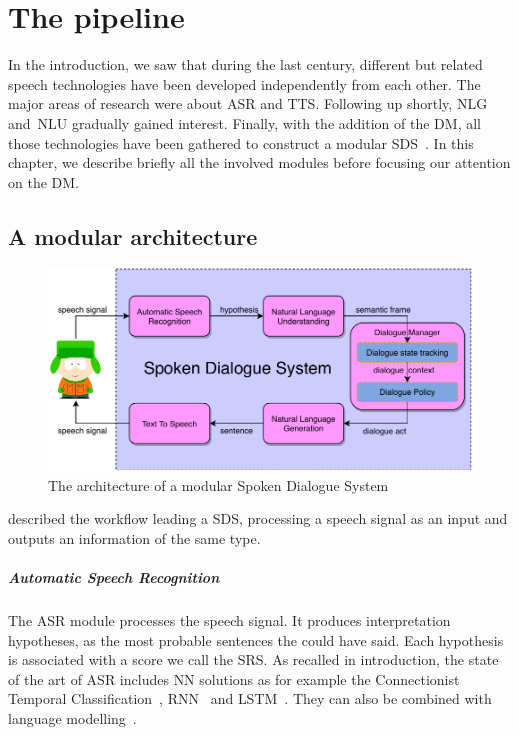 \chapter{The pipeline}
\label{chapter:the-pipeline}

In the introduction, we saw that during the last century, different but related speech technologies have been developed independently from each other. The major areas of research were about \acrfull{ASR} and \acrfull{TTS}. Following up shortly, \acrfull{NLG} and \acrfull{NLU} gradually gained interest. Finally, with the addition of the \acrfull{DM}, all those technologies have been gathered to construct a modular \acrfull{SDS}~\parencite{Jurafsky2000-intro-sds}. In this chapter, we describe briefly all the involved modules before focusing our attention on the \gls{DM}.

\section{A modular architecture}

\begin{figure}

    \includegraphics[width=\textwidth]{sources/pipeline/pipeline}
    \caption{\label{fig:pipeline} The architecture of a modular Spoken Dialogue System}
\end{figure}


 described the workflow leading a \gls{SDS}, processing a speech signal as an input and outputs an information of the same type.

\paragraph{Automatic Speech Recognition}

The \gls{ASR} module processes the speech signal. It produces interpretation hypotheses, as the most probable sentences the  could have said. Each hypothesis is associated with a score we call the \gls{SRS}. As recalled in introduction, the state of the art of \gls{ASR} includes \acrlong{NN} solutions as for example the Connectionist Temporal Classification~\parencite{Kim2018-CTC-asr}, \gls{RNN}~\parencite{rnn-asr} and \gls{LSTM}~\parencite{Kim2017-lstm-asr}. They can also be combined with language modelling~\parencite{Chorowski2017-rnnml-asr,Kyungmin2018-rnnml-asr}.

